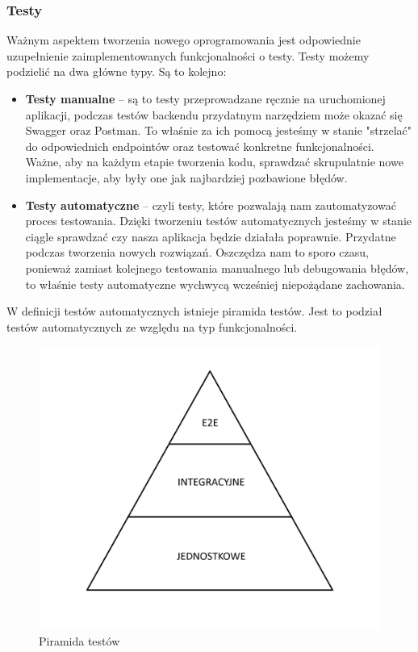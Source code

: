 \documentclass[a4paper,twoside,12pt]{book}
\begin{document}
\subsubsection{Testy}
Ważnym aspektem tworzenia nowego oprogramowania jest odpowiednie uzupełnienie zaimplementowanych funkcjonalności o testy. Testy możemy podzielić na dwa główne typy.
Są to kolejno:
\begin{itemize}
    \item \textbf{Testy manualne} -- są to testy przeprowadzane ręcznie na uruchomionej aplikacji, podczas testów backendu przydatnym narzędziem może okazać się Swagger oraz Postman. To właśnie za ich pomocą jesteśmy w stanie "strzelać" do odpowiednich endpointów oraz testować konkretne funkcjonalności. Ważne, aby na każdym etapie tworzenia kodu, sprawdzać skrupulatnie nowe implementacje, aby były one jak najbardziej pozbawione błędów.
    \item \textbf{Testy automatyczne} -- czyli testy, które pozwalają nam zautomatyzować proces testowania. Dzięki tworzeniu testów automatycznych jesteśmy w stanie ciągle sprawdzać czy nasza aplikacja będzie działała poprawnie. Przydatne podczas tworzenia nowych rozwiązań. Oszczędza nam to sporo czasu, ponieważ zamiast kolejnego testowania manualnego lub debugowania błędów, to właśnie testy automatyczne wychwycą wcześniej niepożądane zachowania.
\end{itemize}

W definicji testów automatycznych istnieje piramida testów. Jest to podział testów automatycznych ze względu na typ funkcjonalności.
\begin{figure}[H]
    \centering
    \includegraphics[width=1\textwidth]{testy.png}
    \caption{Piramida testów}
    \label{Tests}
\end{figure}
\end{document}

